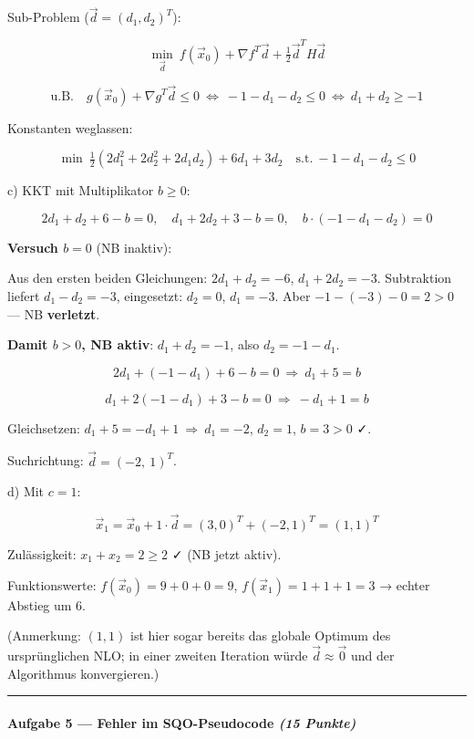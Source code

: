 \documentclass[11pt, a4paper]{article}
\begin{document}
Sub-Problem ($\vec{d} = (d_1,d_2)^T$):

\[
\min_{\vec{d}}\ f(\vec{x}_0) + \nabla f^T\vec{d} + \tfrac{1}{2}\vec{d}^T H \vec{d}
\]

\[
\text{u.B.}\quad g(\vec{x}_0) + \nabla g^T\vec{d} \le 0\ \Leftrightarrow\ -1 - d_1 - d_2 \le 0\ \Leftrightarrow\ d_1 + d_2 \ge -1
\]


Konstanten weglassen:

\[
\min\ \tfrac{1}{2}(2d_1^2 + 2d_2^2 + 2d_1 d_2) + 6d_1 + 3d_2 \quad\text{s.t.}\ -1 - d_1 - d_2 \le 0
\]


c) KKT mit Multiplikator $b \ge 0$:


\[
2d_1 + d_2 + 6 - b = 0,\quad d_1 + 2d_2 + 3 - b = 0,\quad b\cdot(-1-d_1-d_2) = 0
\]


\textbf{Versuch $b=0$} (NB inaktiv):

Aus den ersten beiden Gleichungen: $2d_1+d_2=-6$, $d_1+2d_2=-3$. Subtraktion liefert $d_1 - d_2 = -3$, eingesetzt: $d_2 = 0$, $d_1 = -3$. Aber $-1 - (-3) - 0 = 2 > 0$ — NB \textbf{verletzt}.


\textbf{Damit $b>0$, NB aktiv}: $d_1 + d_2 = -1$, also $d_2 = -1 - d_1$.


\[
2d_1 + (-1-d_1) + 6 - b = 0\ \Rightarrow\ d_1 + 5 = b
\]

\[
d_1 + 2(-1-d_1) + 3 - b = 0\ \Rightarrow\ -d_1 + 1 = b
\]


Gleichsetzen: $d_1 + 5 = -d_1 + 1\ \Rightarrow\ d_1 = -2$, $d_2 = 1$, $b = 3 > 0$ ✓.


Suchrichtung: $\vec{d} = (-2,\ 1)^T$.


d) Mit $c=1$:

\[
\vec{x}_1 = \vec{x}_0 + 1\cdot \vec{d} = (3,0)^T + (-2,1)^T = (1,1)^T
\]


Zulässigkeit: $x_1 + x_2 = 2 \ge 2$ ✓ (NB jetzt aktiv).


Funktionswerte: $f(\vec{x}_0) = 9 + 0 + 0 = 9$, $f(\vec{x}_1) = 1 + 1 + 1 = 3$ → echter Abstieg um 6.


(Anmerkung: $(1,1)$ ist hier sogar bereits das globale Optimum des ursprünglichen NLO; in einer zweiten Iteration würde $\vec{d} \approx \vec{0}$ und der Algorithmus konvergieren.)



\noindent\textcolor{rulegray}{\rule{\linewidth}{0.4pt}}


\paragraph{Aufgabe 5 — Fehler im SQO-Pseudocode \textit{(15 Punkte)}}\mbox{}\\[2pt]
\end{document}
